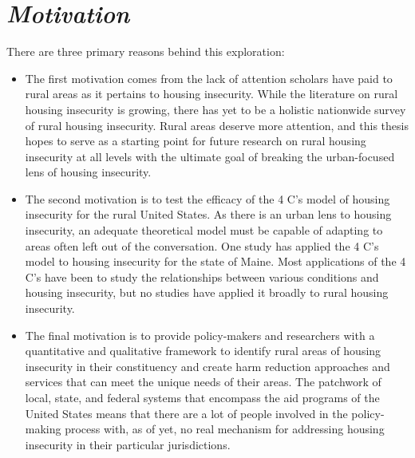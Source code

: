 \section{\textit{Motivation}}
There are three primary reasons behind this exploration:
\begin{itemize}
    \item{The first motivation comes from the lack of attention scholars have paid to rural areas as it pertains to housing insecurity. While the literature on rural housing insecurity is growing, there has yet to be a holistic nationwide survey of rural housing insecurity. Rural areas deserve more attention, and this thesis hopes to serve as a starting point for future research on rural housing insecurity at all levels with the ultimate goal of breaking the urban-focused lens of housing insecurity.}
    \item{The second motivation is to test the efficacy of the 4 C's model of housing insecurity for the rural United States. As there is an urban lens to housing insecurity, an adequate theoretical model must be capable of adapting to areas often left out of the conversation. One study \citep{gleason_using_2021} has applied the 4 C's model to housing insecurity for the state of Maine. Most applications of the 4 C's have been to study the relationships between various conditions and housing insecurity, but no studies have applied it broadly to rural housing insecurity.}
    \item{The final motivation is to provide policy-makers and researchers with a quantitative and qualitative framework to identify rural areas of housing insecurity in their constituency and create harm reduction approaches and services that can meet the unique needs of their areas. The patchwork of local, state, and federal systems that encompass the aid programs of the United States means that there are a lot of people involved in the policy-making process with, as of yet, no real mechanism for addressing housing insecurity in their particular jurisdictions.}

\end{itemize}

